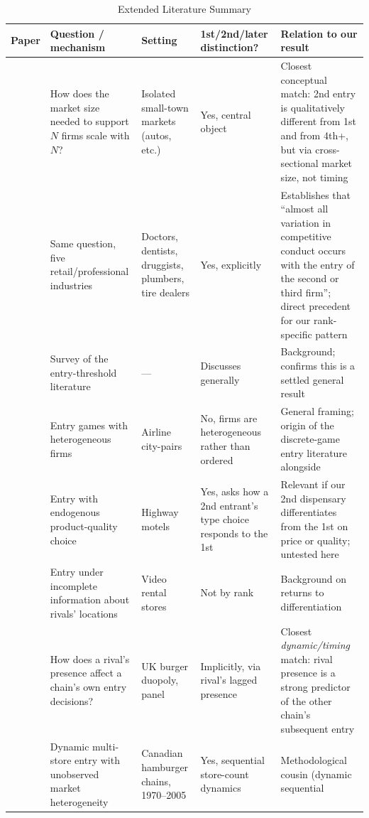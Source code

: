 \documentclass[12pt]{article}
\begin{document}
\begin{table}[htbp]
\centering
\footnotesize
\caption{Extended Literature Summary}
\label{tab:app_literature}
\begin{tabular}{p{2.6cm}p{3.6cm}p{2.6cm}p{2.3cm}p{3.5cm}}
\toprule
Paper & Question / mechanism & Setting & 1st/2nd/later distinction? & Relation to our result \\
\midrule
\citet{BresnahanReiss1990} & How does the market size needed to support $N$ firms scale with $N$? &
  Isolated small-town markets (autos, etc.) & Yes, central object & Closest conceptual match: 2nd entry is
  qualitatively different from 1st and from 4th+, but via cross-sectional market size, not timing \\
\citet{BresnahanReiss1991} & Same question, five retail/professional industries & Doctors, dentists,
  druggists, plumbers, tire dealers & Yes, explicitly & Establishes that ``almost all variation in
  competitive conduct occurs with the entry of the second or third firm''; direct precedent for our
  rank-specific pattern \\
\citet{BerryReiss2007} & Survey of the entry-threshold literature & --- & Discusses generally & Background;
  confirms this is a settled general result \\
\citet{Berry1992} & Entry games with heterogeneous firms & Airline city-pairs & No, firms are heterogeneous
  rather than ordered & General framing; origin of the discrete-game entry literature alongside
  \citeauthor{BresnahanReiss1990} \\
\citet{Mazzeo2002} & Entry with endogenous product-quality choice & Highway motels & Yes, asks how a 2nd
  entrant's type choice responds to the 1st & Relevant if our 2nd dispensary differentiates from the 1st on
  price or quality; untested here \\
\citet{Seim2006} & Entry under incomplete information about rivals' locations & Video rental stores & Not by
  rank & Background on returns to differentiation \\
\citet{ToivanenWaterson2005} & How does a rival's presence affect a chain's own entry decisions? & UK burger
  duopoly, panel & Implicitly, via rival's lagged presence & Closest \emph{dynamic/timing} match: rival
  presence is a strong predictor of the other chain's subsequent entry \\
\citet{IgamiYang2016} & Dynamic multi-store entry with unobserved market heterogeneity & Canadian hamburger
  chains, 1970--2005 & Yes, sequential store-count dynamics & Methodological cousin (dynamic sequential

\end{tabular}
\end{table}
\end{document}
